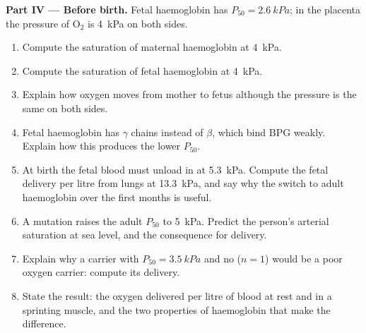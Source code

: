 \begin{problem}
\medskip
\noindent\textbf{Part IV --- Before birth.}
Fetal haemoglobin has $P_{50} = \qty{2.6}{kPa}$; in the placenta the
pressure of $\mathrm{O_2}$ is \qty{4}{kPa} on both sides.
\begin{enumerate}[resume]
  \item Compute the saturation of maternal haemoglobin at \qty{4}{kPa}.
  \item Compute the saturation of fetal haemoglobin at \qty{4}{kPa}.
  \item Explain how oxygen moves from mother to fetus although the
        pressure is the same on both sides.
  \item Fetal haemoglobin has $\gamma$ chains instead of $\beta$, which
        bind BPG weakly. Explain how this produces the lower $P_{50}$.
  \item At birth the fetal blood must unload in  at
        \qty{5.3}{kPa}. Compute the fetal delivery per litre from lungs
        at \qty{13.3}{kPa}, and say why the switch to adult
        haemoglobin over the first months is useful.
  \item A mutation raises the adult $P_{50}$ to \qty{5}{kPa}. Predict
        the person's arterial saturation at sea level, and the
        consequence for delivery.
  \item Explain why a carrier with $P_{50} = \qty{3.5}{kPa}$ and no
         ($n = 1$) would be a poor oxygen carrier: compute
        its delivery.
  \item State the result: the oxygen delivered per litre of blood at
        rest and in a sprinting muscle, and the two properties of
        haemoglobin that make the difference.
\end{enumerate}
\end{problem}
